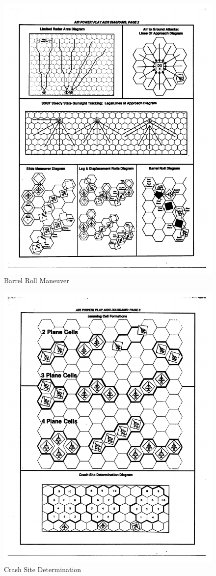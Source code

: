 \documentclass[10pt]{article}
\begin{document}
\begin{figure}
\centering
\caption{Barrel Roll Maneuver}
\medskip
\includegraphics[width=0.6\linewidth]{figures/aids-barrel-roll.pdf}
\end{figure}



\begin{figure}
\centering
\caption{Crash Site Determination}
\medskip
\includegraphics[width=0.6\linewidth]{figures/aids-crash-site.pdf}
\end{figure}









\end{document}
